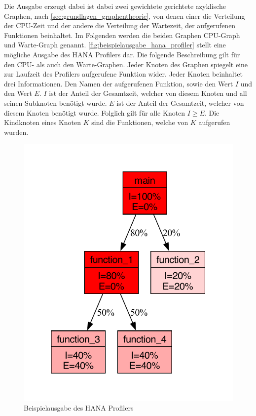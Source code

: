 Die Ausgabe erzeugt dabei ist dabei zwei gewichtete gerichtete azyklische
Graphen, nach \autoref{sec:grundlagen_graphentheorie}, von denen einer die Verteilung der CPU-Zeit und der andere die
Verteilung der Wartezeit, der aufgerufenen Funktionen beinhaltet. Im Folgenden
werden die beiden Graphen CPU-Graph und Warte-Graph genannt.
\autoref{fig:beispielausgabe_hana_profiler} stellt eine mögliche Ausgabe des
HANA Profilers dar. Die folgende Beschreibung gilt für den CPU- als auch den
Warte-Graphen. Jeder Knoten des Graphen spiegelt eine zur Laufzeit des
Profilers aufgerufene Funktion wider. Jeder Knoten beinhaltet drei
Informationen. Den Namen der aufgerufenen Funktion, sowie den Wert $I$ und den
Wert $E$. $I$ ist der Anteil der Gesamtzeit, welcher von diesem Knoten und all
seinen Subknoten benötigt wurde. $E$ ist der Anteil der Gesamtzeit, welcher
von diesem Knoten benötigt wurde. Folglich gilt für alle Knoten $I\geq E$.
Die Kindknoten eines Knoten $K$ sind die Funktionen, welche von $K$ aufgerufen
wurden.
\begin{figure}[h]
    \begin{center}
        \includegraphics[page=1]{Bilder/pdf/profiler_output_example.pdf}
    \end{center}
    \caption{Beispielausgabe des HANA Profilers}\label{fig:beispielausgabe_hana_profiler}
\end{figure}


